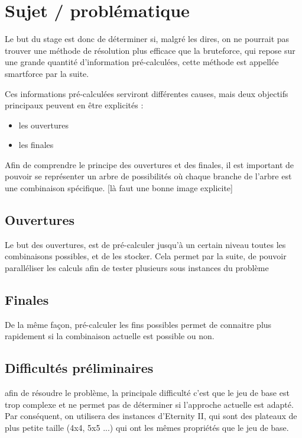 \documentclass{article}
\begin{document}
	\section{Sujet / problématique}
	
	Le but du stage est donc de déterminer si, malgré les dires, on ne pourrait pas trouver une méthode de résolution plus efficace que la bruteforce, qui repose sur une grande quantité d'information pré-calculées, cette méthode est appellée smartforce par la suite.
	
	Ces informations pré-calculées serviront différentes causes, mais deux objectifs principaux peuvent en être explicités :
	
	\begin{itemize}
		\item les ouvertures
		\item les finales
	\end{itemize}
	
	Afin de comprendre le principe des ouvertures et des finales, il est important de pouvoir se représenter un arbre de possibilités où chaque branche de l'arbre est une combinaison spécifique. [là faut une bonne image explicite]
	
	\subsection{Ouvertures}
	
	Le but des ouvertures, est de pré-calculer jusqu'à un certain niveau toutes les combinaisons possibles, et de les stocker. Cela permet par la suite, de pouvoir paralléliser les calculs afin de tester plusieurs sous instances du problème
	
	\subsection{Finales}
	
	De la même façon, pré-calculer les fins possibles permet de connaitre plus rapidement si la combinaison actuelle est possible ou non.
	
	
	\subsection{Difficultés préliminaires}
	
	afin de résoudre le problème, la principale difficulté c'est que le jeu de base est trop complexe et ne permet pas de déterminer si l'approche actuelle est adapté. Par conséquent, on utilisera des instances d'Eternity II, qui sont des plateaux de plus petite taille (4x4, 5x5 ...) qui ont les mêmes propriétés que le jeu de base.
	
\end{document}
